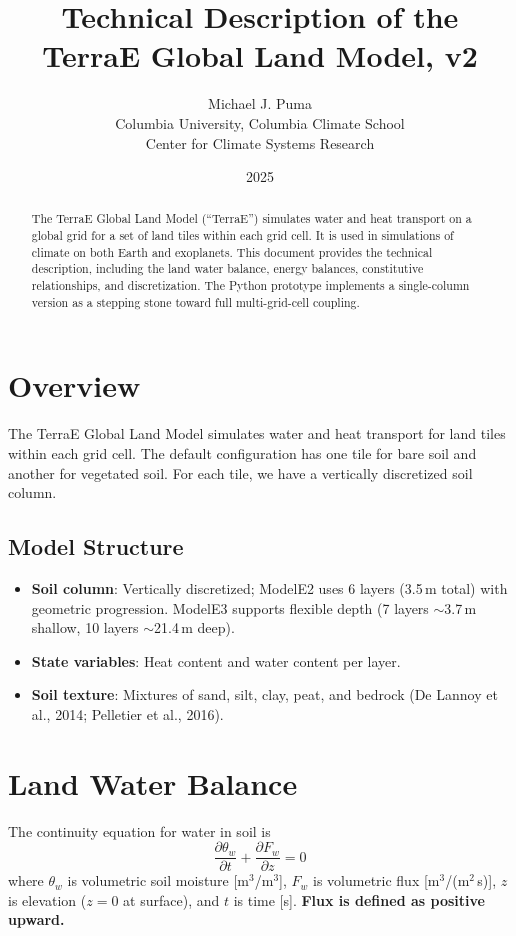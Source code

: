 \documentclass[11pt,a4paper]{article}
\title{Technical Description of the TerraE Global Land Model, v2}
\author{Michael J. Puma\\Columbia University, Columbia Climate School\\Center for Climate Systems Research}
\date{2025}
\begin{document}
\maketitle

\begin{abstract}
The TerraE Global Land Model (``TerraE'') simulates water and heat transport on a global grid for a set of land tiles within each grid cell. It is used in simulations of climate on both Earth and exoplanets. This document provides the technical description, including the land water balance, energy balances, constitutive relationships, and discretization. The Python prototype implements a single-column version as a stepping stone toward full multi-grid-cell coupling.
\end{abstract}

\section{Overview}

The TerraE Global Land Model simulates water and heat transport for land tiles within each grid cell. The default configuration has one tile for bare soil and another for vegetated soil. For each tile, we have a vertically discretized soil column.

\subsection{Model Structure}

\begin{itemize}
\item \textbf{Soil column}: Vertically discretized; ModelE2 uses 6 layers (3.5\,m total) with geometric progression. ModelE3 supports flexible depth (7 layers $\sim$3.7\,m shallow, 10 layers $\sim$21.4\,m deep).
\item \textbf{State variables}: Heat content and water content per layer.
\item \textbf{Soil texture}: Mixtures of sand, silt, clay, peat, and bedrock (De Lannoy et al., 2014; Pelletier et al., 2016).
\end{itemize}

\section{Land Water Balance}

The continuity equation for water in soil is
\begin{equation}
\frac{\partial \theta_w}{\partial t} + \frac{\partial F_w}{\partial z} = 0
\end{equation}
where $\theta_w$ is volumetric soil moisture [m$^3$/m$^3$], $F_w$ is volumetric flux [m$^3$/(m$^2$\,s)], $z$ is elevation ($z=0$ at surface), and $t$ is time [s]. \textbf{Flux is defined as positive upward.}
\end{document}
